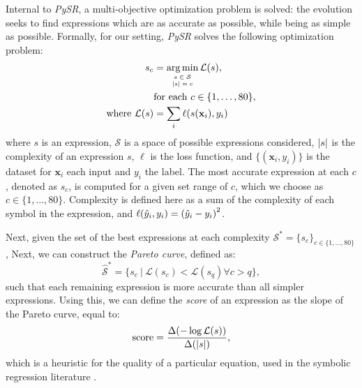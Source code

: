 \documentclass[nohyperref]{article}
\newcommand\pysr{\textit{PySR}\xspace}
\theoremstyle{plain}
\theoremstyle{definition}
\theoremstyle{remark}
\begin{document}
Internal to \pysr, a multi-objective optimization problem is solved: the evolution seeks to find expressions which are as accurate as possible, while being as simple as possible.
Formally, for our setting, \pysr solves the following optimization problem:
\begin{align}
    s_c &= 
        \mathop{\arg\min}_{
            \tiny
            \begin{array}{c}s\in\mathcal{S}\\ \abs{s} = c \end{array}
        }
        \mathcal{L}(s),
        \\
    &\text{for each } c \in \{1, \ldots, 80\},\nonumber\\
    \text{where }\mathcal{L}(s) &= \sum_i \ell(s(\mathbf{x}_i), y_i)
\end{align}
where $s$ is an expression, 
$\mathcal{S}$ is a space of possible expressions considered,
$\abs{s}$ is the complexity of an expression $s$,
$\ell$ is the loss function, and $\{(\mathbf x_i, y_i)\}$ is the dataset
for $\mathbf x_i$ each input and $y_i$ the label.
The most accurate expression at each $c$, denoted as $s_c$, is computed for a given set range of $c$, which we choose as $c\in\{1, \ldots, 80\}$.
Complexity is defined here
as a sum of the complexity of each symbol in the expression,
and $\ell(\hat{y}_i, y_i) = \qty(\hat{y}_i - y_i)^2$.

Next, given the set of the best expressions at each complexity $\mathcal{S}^\ast = \{s_c\}_{c\in\{1,\ldots,80\}}$,
Next, we can construct the \textit{Pareto curve}, defined as:
\begin{equation}
    \hat{\mathcal{S}}^\ast = \{s_c \ |\ \mathcal{L}(s_c) < \mathcal{L}(s_q) \forall c > q \},
\end{equation}
such that each remaining expression is more accurate than all simpler expressions.
Using this, we can define the \textit{score} of an expression as the slope of the Pareto curve, equal to:
\begin{equation}
    \text{score} = \frac{\Delta (-\log \mathcal{L}(s))}{\Delta(\abs{s})},
\end{equation}
which is a heuristic for the quality of a particular equation, used in the symbolic regression literature \cite{eureqa,cranmerDiscoveringSymbolicModels2020}.

\end{document}
